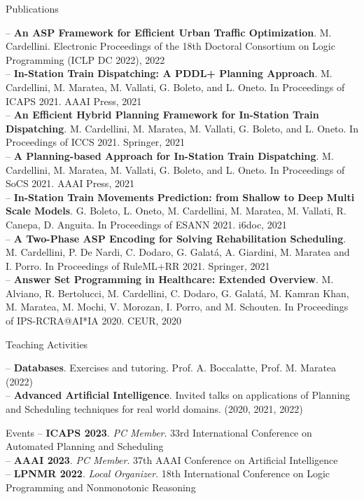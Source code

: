 \documentclass{resume} %
\begin{document}
\begin{rSection}{Publications}

-- \textbf{An ASP Framework for Efficient Urban Traffic Optimization}. M. Cardellini. Electronic Proceedings of the 18th Doctoral Consortium on Logic Programming (ICLP DC 2022), 2022 \\
-- \textbf{In-Station Train Dispatching: A PDDL+ Planning Approach}. M. Cardellini, M. Maratea, M. Vallati, G. Boleto, and L. Oneto. In Proceedings of ICAPS 2021. AAAI Press, 2021 \\
-- \textbf{An Efficient Hybrid Planning Framework for In-Station Train Dispatching}. M. Cardellini, M. Maratea, M. Vallati, G. Boleto, and L. Oneto. In Proceedings of ICCS 2021. Springer, 2021 \\
-- \textbf{A Planning-based Approach for In-Station Train Dispatching}. M. Cardellini, M. Maratea, M. Vallati, G. Boleto, and L. Oneto. In Proceedings of SoCS 2021. AAAI Press, 2021\\
-- \textbf{In-Station Train Movements Prediction: from Shallow to Deep Multi Scale Models}. G. Boleto, L. Oneto, M. Cardellini, M. Maratea, M. Vallati, R. Canepa, D. Anguita. In Proceedings of ESANN 2021. i6doc, 2021\\
-- \textbf{A Two-Phase ASP Encoding for Solving Rehabilitation Scheduling}. M. Cardellini, P. De Nardi, C. Dodaro, G. Galat\'a, A. Giardini, M. Maratea and I. Porro. In Proceedings of RuleML+RR 2021. Springer, 2021\\
-- \textbf{Answer Set Programming in Healthcare: Extended Overview}. M. Alviano, R. Bertolucci, M. Cardellini, C. Dodaro, G. Galat\'a, M. Kamran Khan, M. Maratea, M. Mochi, V. Morozan, I. Porro, and M. Schouten. In Proceedings of IPS-RCRA@AI*IA 2020. CEUR, 2020
\end{rSection}

\begin{rSection}{Teaching Activities}

-- \textbf{Databases}. Exercises and tutoring. Prof. A. Boccalatte, Prof. M. Maratea (2022)\\
-- \textbf{Advanced Artificial Intelligence}. Invited talks on applications of Planning and Scheduling techniques for real world domains. (2020, 2021, 2022)
\end{rSection}


\begin{rSection}{Events}
-- \textbf{ICAPS 2023}. \textit{PC Member}. 33rd International Conference on Automated Planning and Scheduling \\
-- \textbf{AAAI 2023}. \textit{PC Member}. 37th AAAI Conference on Artificial Intelligence  \\
-- \textbf{LPNMR 2022}. \textit{Local Organizer}. 18th International Conference on Logic Programming and Nonmonotonic Reasoning  \\
\end{rSection}
\end{document}
